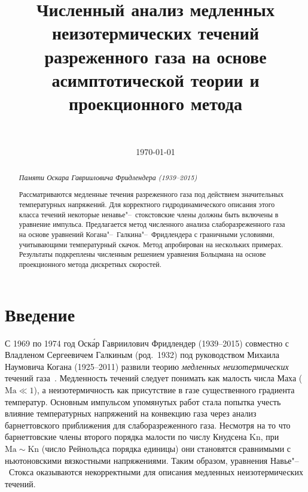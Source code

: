 \documentclass[
aps,%
12pt,%
final,%
notitlepage,%
oneside,%
onecolumn,%
nobibnotes,%
nofootinbib,%
superscriptaddress,%
noshowpacs,%
showkeys,%
centertags]%
{revtex4}
\newcommand{\Kn}{\mathrm{Kn}}
\newcommand{\Ma}{\mathrm{Ma}}
\begin{document}

\title{Численный анализ медленных неизотермических течений разреженного газа на основе асимптотической теории и проекционного метода}
\author{~}

\date{\today}

\begin{abstract}
    \begin{flushright}
    \vspace{1em}
    {\it Памяти Оскара Гаврииловича Фридлендера (1939--2015)}
    \vspace{1em}
    \end{flushright}
    Рассматриваются медленные течения разреженного газа
    под действием значительных температурных напряжений.
    Для корректного гидродинамического описания этого класса течений
    некоторые ненавье"--~стокстовские члены должны быть включены в
    уравнение импульса.
    Предлагается метод численного анализа слаборазреженного газа
    на основе уравнений Когана"--~Галкина"--~Фридлендера
    с граничными условиями, учитывающими температурный скачок.
    Метод апробирован на нескольких примерах.
    Результаты подкреплены численным решением уравнения Больцмана
    на основе проекционного метода дискретных скоростей.
\end{abstract}


\maketitle

\section{Введение}

С 1969 по 1974 год Оск\'{а}р Гавриилович Фридлендер (1939--2015)
совместно с Владленом Сергеевичем Галкиным (род.~1932)
под руководством Михаила Наумовича Когана (1925--2011)
развили теорию \emph{медленных неизотермических}
течений газа~\cite{Kogan1970, Kogan1971, Friedlander1974, Galkin1974, Kogan1976}.
Медленность течений следует понимать как малость числа Маха (\(\Ma\ll1\)),
а неизотермичность как присутствие в газе существенного градиента температур.
Основным импульсом упомянутых работ стала попытка учесть влияние температурных напряжений
на конвекцию газа через анализ барнеттовского приближения для слаборазреженного газа.
Несмотря на то что барнеттовские члены второго порядка малости по числу Кнудсена \(\Kn\),
при \(\Ma\sim\Kn\) (число Рейнольдса порядка единицы)
они становятся сравнимыми с ньютоновскими вязкостными напряжениями.
Таким образом, уравнения Навье"--~Стокса оказываются некорректными для
описания медленных неизотермических течений.
\end{document}
